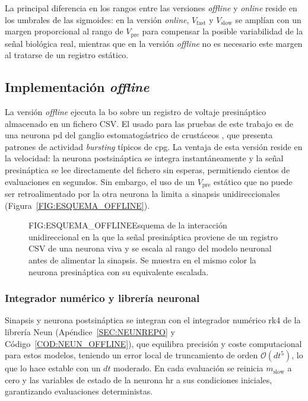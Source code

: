 La principal diferencia en los rangos entre las versiones \textit{offline} y \textit{online} reside en los umbrales de las sigmoides: en la versión \textit{online}, $V_{\mathrm{fast}}$ y $V_{\mathrm{slow}}$ se amplían con un margen proporcional al rango de $V_{\mathrm{pre}}$ para compensar la posible variabilidad de la señal biológica real, mientras que en la versión \textit{offline} no es necesario este margen al tratarse de un registro estático.


\subsection{Implementación \textit{offline}\label{SUBSEC:IMPLEMENTACION_OFFLINE}}

La versión \textit{offline} ejecuta la \ac{bo} sobre un registro de voltaje presináptico almacenado en un fichero CSV. El usado para las pruebas de este trabajo es de una neurona \ac{pd} del ganglio estomatogástrico de crustáceos \cite{marder2007understanding}, que presenta patrones de actividad \textit{bursting} típicos de \ac{cpg}. La ventaja de esta versión reside en la velocidad: la neurona postsináptica se integra instantáneamente y la señal presináptica se lee directamente del fichero sin esperas, permitiendo cientos de evaluaciones en segundos. Sin embargo, el uso de un \(V_{\mathrm{pre}}\) estático que no puede ser retroalimentado por la otra neurona la limita a sinapsis unidireccionales (Figura~\ref{FIG:ESQUEMA_OFFLINE}).

\begin{figure}[Esquema de la interacción unidireccional biohíbrida en la implementación \textit{offline}]{FIG:ESQUEMA_OFFLINE}{Esquema de la interacción unidireccional en la que la señal presináptica proviene de un registro CSV de una neurona viva y se escala al rango del modelo neuronal antes de alimentar la sinapsis. Se muestra en el mismo color la neurona presináptica con su equivalente escalada.}
\end{figure}

\subsubsection{Integrador numérico y librería neuronal}

Sinapsis y neurona postsináptica se integran con el integrador numérico \ac{rk4} \cite{Butcher2016} de la librería Neun (Apéndice~\ref{SEC:NEUNREPO} y Código~\ref{COD:NEUN_OFFLINE}), que equilibra precisión y coste computacional para estos modelos, teniendo un error local de truncamiento de orden $\mathcal{O}(dt^5)$, lo que lo hace estable con un $dt$ moderado. En cada evaluación se reinicia $m_{\mathrm{slow}}$ a cero y las variables de estado de la neurona \ac{hr} a sus condiciones iniciales, garantizando evaluaciones deterministas.

